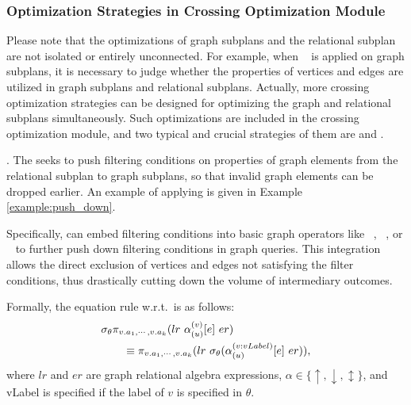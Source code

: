 \subsubsection{Optimization Strategies in Crossing Optimization Module}

Please note that the optimizations of graph subplans and the relational subplan are not isolated or entirely unconnected.
For example, when \trimrule~ is applied on graph subplans, it is necessary to judge whether the properties of vertices and edges are utilized in graph subplans and relational subplans.
Actually, more crossing optimization strategies can be designed for optimizing the graph and relational subplans simultaneously.
Such optimizations are included in the crossing optimization module, and two typical and crucial strategies of them are \filterrule and \intersectrule. 

\filterrule. 
The \filterrule seeks to push filtering conditions on properties of graph elements from the relational subplan to graph subplans, so that invalid graph elements can be dropped earlier.
An example of applying \filterrule is given in Example \ref{example:push_down}.

Specifically, \filterrule can embed filtering conditions into basic graph operators like \scan~, \expandedge~, or \getvertex~ to further push down filtering conditions in graph queries. 
This integration allows the direct exclusion of vertices and edges not satisfying the filter conditions, thus drastically cutting down the volume of intermediary outcomes.

Formally, the equation rule w.r.t.~\filterrule is as follows:
\begin{equation}
    \begin{split}
    & \sigma_{\theta}\pi_{v.a_1, \cdots, v.a_k}(lr~\alpha_{(u)}^{(v)}[e]~er) \\
    & \hspace*{2em} \equiv \pi_{v.a_1, \cdots, v.a_k}(lr~\sigma_{\theta}(\alpha_{(u)}^{(v:vLabel)}[e]~er)), \\
    \end{split}
\end{equation}
where $lr$ and $er$ are graph relational algebra expressions, $\alpha \in \{\uparrow, \downarrow, \updownarrow\}$, and vLabel is specified if the label of $v$ is specified in $\theta$.


